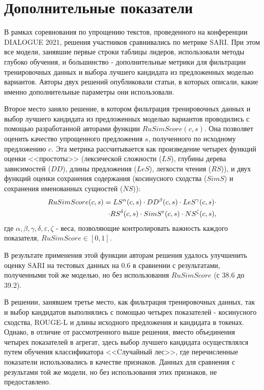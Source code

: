 \section{Дополнительные показатели}

В рамках соревнования по упрощению текстов, проведенного на конференции DIALOGUE 2021, решения участников сравнивались по метрике SARI. При этом все модели, занявшие первые строки таблицы лидеров, использовали методы глубоко обучения, и большинство -  дополнительные метрики для фильтрации тренировочных данных и выбора лучшего кандидата из предложенных моделью вариантов. Авторы двух решений опубликовали статьи, в которых описали, какие именно дополнительные параметры они использовали.

Второе место заняло решение\cite{saint_petersburg_russia_rusimscore_2021}, в котором фильтрация тренировочных данных и выбор лучшего кандидата из предложенных моделью вариантов проводились с помощью разработанной авторами функции $RuSimScore(c, s)$. Она позволяет оценить качество упрощенного предложения $s$, полученного по исходному предложению $c$. Эта метрика рассчитывается как произведение четырех функций оценки <<простоты>> (лексической сложности ($LS$), глубины дерева зависимостей ($DD$), длины предложения ($LeS$), легкости чтения ($RS$)), и двух функций оценки сохранения содержания (косинусного сходства ($SimS$) и сохранения именованных сущностей ($NS$)):
\begin{eqnarray} 
	\label{eq:20}
	RuSimScore(c, s) = LS^{\alpha}(c, s) \cdot DD^{\beta}(c, s) \cdot LeS^{\gamma}(c, s) \cdot \notag \\ \cdot  RS^{\delta}(c, s) \cdot SimS^{\varepsilon}(c, s) \cdot NS^{\zeta}(c, s) ,
\end{eqnarray}
где $\alpha, \beta, \gamma, \delta, \varepsilon, \zeta$ - веса, позволяющие контролировать важность каждого показателя, $RuSimScore\in{\left[0, 1\right]}$.

В результате применения этой функции авторам решения удалось улучшенить оценку SARI на тестовых данных на 0.6 в сравнении с результатами, полученными той же моделью, но без использования $RuSimScore$ (с 38.6 до 39.2).


В решении\cite{ranepa_moscow_russia_sentence_2021}, занявшем третье место, как фильтрация тренировочных данных, так и выбор кандидатов выполнялись с помощью четырех показателей - косинусного сходства, ROUGE-L и длины исходного предложения и кандидата в токенах. Однако, в отличие от рассмотренного выше решения, вместо объединения четырех показателей в агрегат, здесь выбор лучшего кандидата осуществлялся путем обучения классификатора <<Cлучайный лес>>, где перечисленные показатели использовались в качестве признаков. Данных для сравнения с результами той же модели, но без использования этих признаков, не предоставлено.

